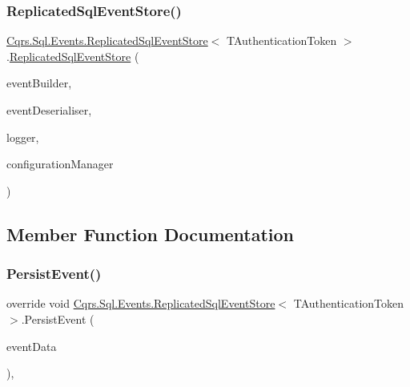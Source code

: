 \subsubsection{\texorpdfstring{Replicated\+Sql\+Event\+Store()}{ReplicatedSqlEventStore()}}
{\footnotesize\ttfamily \hyperlink{classCqrs_1_1Sql_1_1Events_1_1ReplicatedSqlEventStore}{Cqrs.\+Sql.\+Events.\+Replicated\+Sql\+Event\+Store}$<$ T\+Authentication\+Token $>$.\hyperlink{classCqrs_1_1Sql_1_1Events_1_1ReplicatedSqlEventStore}{Replicated\+Sql\+Event\+Store} (\begin{DoxyParamCaption}\item[{\hyperlink{interfaceCqrs_1_1Events_1_1IEventBuilder}{I\+Event\+Builder}$<$ T\+Authentication\+Token $>$}]{event\+Builder,  }\item[{\hyperlink{interfaceCqrs_1_1Events_1_1IEventDeserialiser}{I\+Event\+Deserialiser}$<$ T\+Authentication\+Token $>$}]{event\+Deserialiser,  }\item[{I\+Logger}]{logger,  }\item[{\hyperlink{interfaceCqrs_1_1Configuration_1_1IConfigurationManager}{I\+Configuration\+Manager}}]{configuration\+Manager }\end{DoxyParamCaption})}



\subsection{Member Function Documentation}
\mbox{\label{classCqrs_1_1Sql_1_1Events_1_1ReplicatedSqlEventStore_a51c9b1329327e456a251aa2d910fc7ae}} 
\subsubsection{\texorpdfstring{Persist\+Event()}{PersistEvent()}}
{\footnotesize\ttfamily override void \hyperlink{classCqrs_1_1Sql_1_1Events_1_1ReplicatedSqlEventStore}{Cqrs.\+Sql.\+Events.\+Replicated\+Sql\+Event\+Store}$<$ T\+Authentication\+Token $>$.Persist\+Event (\begin{DoxyParamCaption}\item[{\hyperlink{classCqrs_1_1Events_1_1EventData}{Event\+Data}}]{event\+Data }\end{DoxyParamCaption})\hspace{0.3cm}{\ttfamily [protected]}, {\ttfamily [virtual]}}



